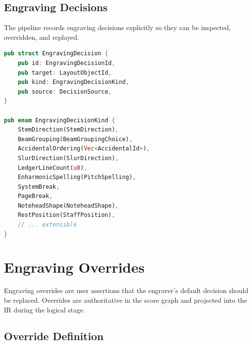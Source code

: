 \documentclass[11pt,letterpaper]{report}
\begin{document}
\subsection{Engraving Decisions}

The pipeline records engraving decisions explicitly so they can be
inspected, overridden, and replayed.

\begin{lstlisting}[language=Rust]
pub struct EngravingDecision {
    pub id: EngravingDecisionId,
    pub target: LayoutObjectId,
    pub kind: EngravingDecisionKind,
    pub source: DecisionSource,
}

pub enum EngravingDecisionKind {
    StemDirection(StemDirection),
    BeamGrouping(BeamGroupingChoice),
    AccidentalOrdering(Vec<AccidentalId>),
    SlurDirection(SlurDirection),
    LedgerLineCount(u8),
    EnharmonicSpelling(PitchSpelling),
    SystemBreak,
    PageBreak,
    NoteheadShape(NoteheadShape),
    RestPosition(StaffPosition),
    // ... extensible
}
\end{lstlisting}

\section{Engraving Overrides}
\label{sec:layoutir:overrides}

Engraving overrides are user assertions that the engraver's default
decision should be replaced. Overrides are authoritative in the score
graph and projected into the IR during the logical stage.

\subsection{Override Definition}
\end{document}
